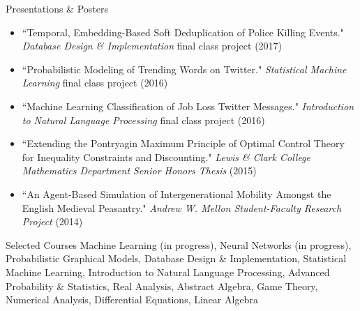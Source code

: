 \documentclass{resume} %
\begin{document}
\begin{rSection}{Presentations \& Posters}

\begin{itemize}
\item ``Temporal, Embedding-Based Soft Deduplication of Police Killing Events." \emph{Database Design \& Implementation} final class project (2017) 
\item  ``Probabilistic Modeling of Trending Words on Twitter." \emph{Statistical Machine Learning} final class project (2016) 
\item ``Machine Learning Classification of Job Loss Twitter Messages." \emph{Introduction to Natural Language Processing} final class project (2016) 
\item ``Extending the Pontryagin Maximum Principle of Optimal Control Theory for Inequality Constraints and Discounting." \emph{Lewis \& Clark College Mathematics Department Senior Honors Thesis} (2015)
\item ``An Agent-Based Simulation of Intergenerational Mobility Amongst the English Medieval Peasantry." \emph{Andrew W. Mellon Student-Faculty Research Project} (2014) 
\end{itemize} 

\end{rSection}



\begin{rSection}{Selected Courses}
Machine Learning (in progress), Neural Networks (in progress), Probabilistic Graphical Models, Database Design \& Implementation, Statistical Machine Learning, Introduction to Natural Language Processing, Advanced Probability \& Statistics, Real Analysis, Abstract Algebra, Game Theory, Numerical Analysis, Differential Equations, Linear Algebra 
\end{rSection}

\end{document}
